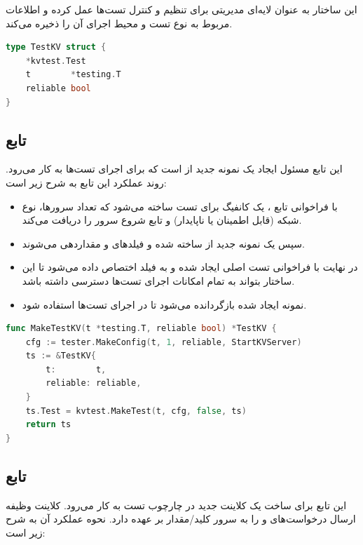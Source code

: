 این ساختار به عنوان لایه‌ای مدیریتی برای تنظیم و کنترل تست‌ها عمل کرده و اطلاعات مربوط به نوع تست و محیط اجرای آن را ذخیره می‌کند.

\begin{latin}
\begin{lstlisting}[language=Go]
type TestKV struct {
    *kvtest.Test
    t        *testing.T
    reliable bool
}
\end{lstlisting}
\end{latin}

\subsection*{تابع }

این تابع مسئول ایجاد یک نمونه جدید از  است که برای اجرای تست‌ها به کار می‌رود. روند عملکرد این تابع به شرح زیر است:

\begin{itemize}
  \item با فراخوانی تابع ، یک کانفیگ برای تست ساخته می‌شود که تعداد سرورها، نوع شبکه (قابل اطمینان یا ناپایدار) و تابع شروع سرور را دریافت می‌کند.
  \item سپس یک نمونه جدید از  ساخته شده و فیلدهای  و  مقداردهی می‌شوند.
  \item در نهایت با فراخوانی  تست اصلی ایجاد شده و به فیلد  اختصاص داده می‌شود تا این ساختار بتواند به تمام امکانات اجرای تست‌ها دسترسی داشته باشد.
  \item نمونه ایجاد شده بازگردانده می‌شود تا در اجرای تست‌ها استفاده شود.
\end{itemize}

\begin{latin}
\begin{lstlisting}[language=Go]
func MakeTestKV(t *testing.T, reliable bool) *TestKV {
    cfg := tester.MakeConfig(t, 1, reliable, StartKVServer)
    ts := &TestKV{
        t:        t,
        reliable: reliable,
    }
    ts.Test = kvtest.MakeTest(t, cfg, false, ts)
    return ts
}
\end{lstlisting}
\end{latin}

\subsection*{تابع }

این تابع برای ساخت یک کلاینت جدید در چارچوب تست به کار می‌رود. کلاینت وظیفه ارسال درخواست‌های  و  را به سرور کلید/مقدار بر عهده دارد. نحوه عملکرد آن به شرح زیر است:

